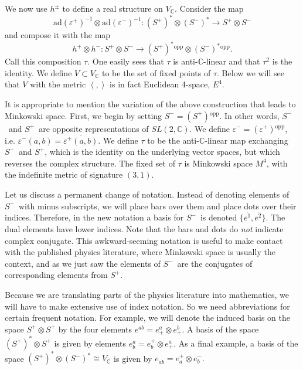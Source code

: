 \documentclass[twoside]{amsart}
\newcommand{\CC}{\ensuremath{\mathbb{C}}}
\renewcommand{\epsilon}{\varepsilon}
\newcommand{\enm}[1]{\ensuremath{#1}}
\newcommand{\ip}[2]{\enm{\left<#1,#2\right>}}
\renewcommand{\bar}[1]{\overline{#1}}
\newcommand{\ad}{\enm{\mathrm{ad}}}
\newcommand{\spl}{\enm{S^{+}}}
\newcommand{\sm}{\enm{S^{-}}}
\newcommand{\spd}{\enm{(\spl)^{*}}}
\newcommand{\smd}{\enm{(\sm)^{*}}}
\newcommand{\eps}{\enm{\epsilon}}
\newcommand{\ei}[1]{\enm{e^{#1}_{+}}}
\newcommand{\eil}[1]{\enm{e_{#1}^{+}}}
\newcommand{\eilb}[1]{\enm{e_{#1}^{-}}}
\renewcommand{\epsilon}{\varepsilon}
\newcommand{\opp}[1]{\enm{{#1}{}^{\mathrm{opp}}}}
\newcommand{\bothupperabc}[3]{\enm{{#1}^{#2 #3}}}
\newcommand{\bothlowerabc}[3]{\enm{{#1}_{#2 #3}}}
\newcommand{\upperlowerabc}[3]{\enm{{#1}^{#2}_{#3}}}
\newcommand{\dotbothlowerabc}[3]{\bothlowerabc{#1}{#2}{\dot{#3}}}
\newcommand{\euu}[2]{\bothupperabc{e}{#1}{#2}}
\newcommand{\eul}[2]{\upperlowerabc{e}{#1}{#2}}
\newcommand{\eldl}[2]{\dotbothlowerabc{e}{#1}{#2}}
\begin{document}
We now use \( h^{\pm} \) to define a real structure on \( V_{\CC} \).
Consider the map
\[ \ad(\eps^{+})^{-1} \otimes \ad(\eps^{-})^{-1}:
\spd\otimes\smd\to \spl\otimes\sm \]
and compose it with the map
\[ h^{+}\otimes h^{-}: \spl\otimes \sm\to \opp{\spd}\otimes
\opp{\smd}. \]
Call this composition \( \tau \).  One easily sees that
\( \tau \) is anti-\CC-linear and that
\( \tau^{2}
\) is the identity.  We define \( V\subset V_{\CC} \) to be the set
of
fixed points of \( \tau \). Below we will see that \( V \) with the metric \ip{}{} is in fact Euclidean 4-space, \( E^4 \).

It is appropriate to mention the variation of the above construction
that leads to Minkowski space.  First, we begin by setting \(
\sm=\opp{(\spl)}.  \) In other words, \sm\ and \spl\ are opposite
representations of \( SL(2,\CC).  \) We define \( \eps^{-} =
\opp{(\eps^{+})} \), i.e. \( \eps^{-}(a,b) = \overline{\eps^{+}(a,b)}
\).  We define \( \tau \) to be the anti-\CC-linear map exchanging
\sm\ and \spl, which is the identity on the underlying vector spaces,
but which reverses the complex structure.  The fixed set of \( \tau \)
is Minkowski space \(M^4\), with the indefinite metric
of signature \( (3,1). \)

Let us discuss a permanent change of notation.  Instead of denoting
elements of \sm\ with minus subscripts, we will place bars over them
and place dots over their indices.  Therefore, in the new notation a
basis for \sm\ is denoted \( \{\bar{e}^{\dot{1}},
\bar{e}^{\dot{2}}\}.
\) The dual elements have lower indices.
Note that the bars and dots do \emph{not} indicate complex
conjugate.  This awkward-seeming notation is useful to make contact
with the published physics literature, where Minkowski space is
usually the context, and as we just saw the elements of \sm\ are the
conjugates of corresponding elements from \spl.

Because we are translating
parts of the physics literature into mathematics, we will have to
make
extensive use of index notation.  So we need abbreviations for
certain
frequent notation.  For example, we will denote the induced basis on
the space \( \spl\otimes\spl \) by the four elements \( \euu{a}{b} =
\ei{a}\otimes \ei{b}. \) A basis of the space \( \spd\otimes\spl \)
is
given by elements \( \eul{a}{b} = \eil{b}\otimes \ei{a}. \)  As a
final
example, a basis of the space \( \spd\otimes\smd\cong V_{\CC} \) is
given by \( \eldl{a}{b} = \eil{a}\otimes\eilb{b}. \)
\end{document}
